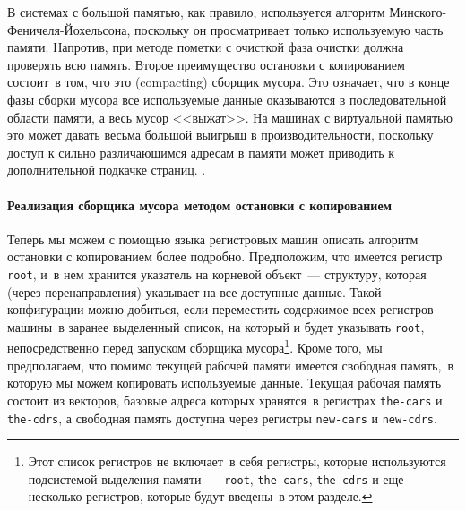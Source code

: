 {В системах с большой памятью, как правило, используется
алгоритм Минского-Феничеля-Йохельсона, поскольку он просматривает
только используемую часть памяти.  Напротив, при
методе пометки с очисткой фаза очистки должна проверять всю память.
Второе преимущество остановки с копированием состоит~в том, что это
 (compacting)
сборщик мусора.  Это означает, что в конце фазы сборки мусора все
используемые данные оказываются в последовательной области памяти, а
весь мусор <<выжат>>. На машинах с виртуальной памятью это может давать
весьма большой выигрыш в производительности, поскольку доступ к сильно
различающимся адресам в памяти может приводить к дополнительной
подкачке страниц.
}.

\paragraph{Реализация сборщика мусора методом остановки с
копированием}


Теперь мы можем с помощью языка регистровых машин описать
алгоритм остановки с копированием более подробно.  Предположим, что
имеется регистр {\tt root}, и~в нем хранится указатель на
корневой объект~--- структуру, которая (через перенаправления) указывает на все доступные
данные.  Такой конфигурации можно добиться, если переместить содержимое всех
регистров машины~в заранее выделенный список, на который и будет
указывать {\tt root}, непосредственно перед запуском сборщика
мусора\footnote{Этот список регистров не включает~в себя регистры,
которые используются подсистемой выделения памяти~---
{\tt root}, {\tt the-cars}, {\tt the-cdrs} и еще
несколько регистров, которые будут введены~в этом разделе.}.
Кроме того, мы предполагаем, что помимо текущей рабочей памяти имеется
свободная память,~в которую мы можем копировать используемые данные.
Текущая рабочая память состоит из векторов, базовые адреса которых
хранятся~в регистрах {\tt the-cars}
и {\tt the-cdrs}, а
свободная память доступна через регистры {\tt new-cars}
и {\tt new-cdrs}.

